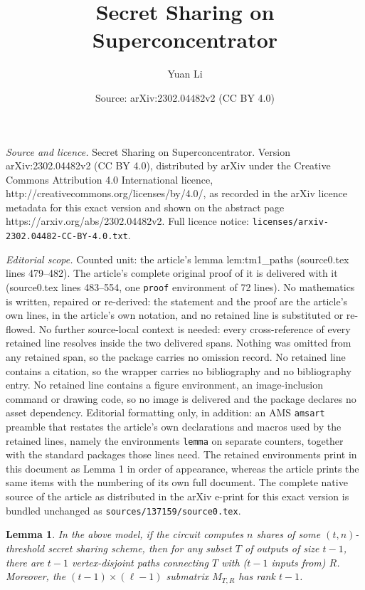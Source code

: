 \documentclass[10pt,a4paper]{amsart}
\title{Secret Sharing on Superconcentrator}
\author{Yuan Li}
\date{Source: arXiv:2302.04482v2 (CC BY 4.0)}
\newtheorem{lemma}{Lemma}
\begin{document}
\maketitle

\noindent\emph{Source and licence.} Secret Sharing on Superconcentrator. Version arXiv:2302.04482v2 (CC BY 4.0), distributed by arXiv under the Creative Commons Attribution 4.0 International licence, http://creativecommons.org/licenses/by/4.0/, as recorded in the arXiv licence metadata for this exact version and shown on the abstract page https://arxiv.org/abs/2302.04482v2. Full licence notice: \texttt{licenses/arxiv-2302.04482-CC-BY-4.0.txt}.\par\smallskip

\noindent\textit{Editorial scope.} Counted unit: the article's lemma lem:tm1\_paths (source0.tex lines 479--482). The article's complete original proof of it is delivered with it (source0.tex lines 483--554, one \texttt{proof} environment of 72 lines). No mathematics is written, repaired or re-derived: the statement and the proof are the article's own lines, in the article's own notation, and no retained line is substituted or re-flowed.  No further source-local context is needed: every cross-reference of every retained line resolves inside the two delivered spans.  Nothing was omitted from any retained span, so the package carries no omission record.  No retained line contains a citation, so the wrapper carries no bibliography and no bibliography entry.  No retained line contains a figure environment, an image-inclusion command or drawing code, so no image is delivered and the package declares no asset dependency.  Editorial formatting only, in addition: an AMS \texttt{amsart} preamble that restates the article's own declarations and macros used by the retained lines, namely the environments \texttt{lemma} on separate counters, together with the standard packages those lines need.  The retained environments print in this document as Lemma 1 in order of appearance, whereas the article prints the same items with the numbering of its own full document.  The complete native source of the article as distributed in the arXiv e-print for this exact version is bundled unchanged as \texttt{sources/137159/source0.tex}.
\begin{lemma}
\label{lem:tm1_paths}
	In the above model, if the circuit computes $n$ shares of some $(t, n)$-threshold secret sharing scheme, then for any subset $T$ of outputs of size $t-1$, there are $t-1$ vertex-disjoint paths connecting $T$ with ($t-1$ inputs from) $R$. Moreover, the $(t-1) \times (\ell-1)$ submatrix $M_{T, R}$ has rank $t-1$.
\end{lemma}
\end{document}
